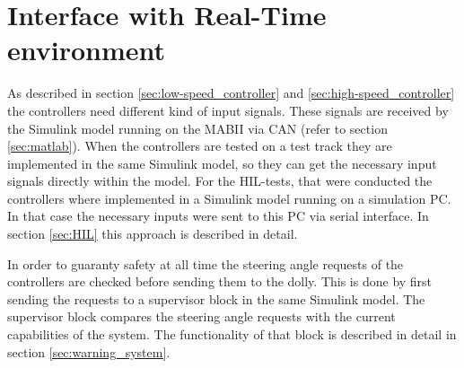 \documentclass[ExampleMasters.tex]{subfiles}
\begin{document}
\section{Interface with Real-Time environment}
\label{sec:interface_with_real_time}
As described in section \ref{sec:low-speed_controller} and \ref{sec:high-speed_controller} the controllers need different kind of input signals. These signals are received by the Simulink model running on the \gls{MABII} via \gls{CAN} (refer to section \ref{sec:matlab}). When the controllers are tested on a test track they are implemented in the same Simulink model, so they can get the necessary input signals directly within the model. For the \gls{HIL}-tests, that were conducted the controllers where implemented in a Simulink model running on a simulation PC. In that case the necessary inputs were sent to this PC via serial interface. In  section \ref{sec:HIL} this approach is described in detail.     

In order to guaranty safety at all time the steering angle requests of the controllers are checked before sending them to the dolly. This is done by first sending the requests to a supervisor block in the same Simulink model. The supervisor block compares the steering angle requests with the current capabilities of the system. The functionality of that block is described in detail in section \ref{sec:warning_system}.   
\end{document}
